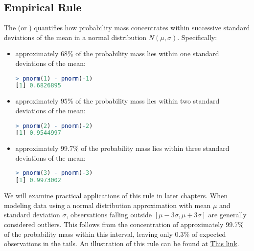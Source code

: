 \subsection{Empirical Rule}

The  (or ) quantifies how probability mass concentrates within successive standard deviations of the mean in a normal distribution \( N(\mu, \sigma) \).
Specifically:
\begin{itemize}
    \item approximately 68\% of the probability mass lies within one standard deviations of the mean:
    \begin{lstlisting}[language=R]
> pnorm(1) - pnorm(-1)
[1] 0.6826895      
    \end{lstlisting}
    \item approximately 95\% of the probability mass lies within two standard deviations of the mean:
    \begin{lstlisting}[language=R]
> pnorm(2) - pnorm(-2)
[1] 0.9544997
    \end{lstlisting}
    \item approximately 99.7\% of the probability mass lies within three standard deviations of the mean:
    \begin{lstlisting}[language=R]
> pnorm(3) - pnorm(-3)
[1] 0.9973002
    \end{lstlisting}
\end{itemize}
We will examine practical applications of this rule in later chapters.
When modeling data using a normal distribution approximation with mean \( \mu \) and standard deviation \( \sigma \),
observations falling outside \( [\mu - 3\sigma, \mu + 3\sigma] \) are generally considered outliers.
This follows from the concentration of approximately 99.7\% of the probability mass within this interval,
leaving only 0.3\% of expected observations in the tails.
An illustration of this rule can be found at \href{https://andymath.com/normal-distribution-empirical-rule/}{This link}.